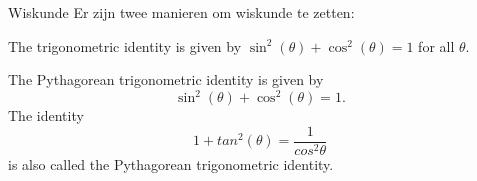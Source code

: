 \begin{frame}[fragile]{Wiskunde}
Er zijn twee manieren om wiskunde te zetten:

\begin{tcolorbox}[width=11cm, title={inline mode}, size=small]
    The trigonometric identity is given by $ \sin^2(\theta) + \cos^2(\theta) = 1 $ for all $ \theta $.
\end{tcolorbox}

 \begin{tcolorbox}[width=11cm, title={display mode}, size=small]
    The Pythagorean trigonometric identity is given by
    \begin{equation} \sin^2(\theta) + \cos^2(\theta) = 1. \end{equation}
    The identity
    \begin{equation} 1 + tan^2(\theta) = \frac{1}{cos^2\theta}\end{equation}
    is also called the Pythagorean trigonometric identity.

\end{tcolorbox}

\end{frame}